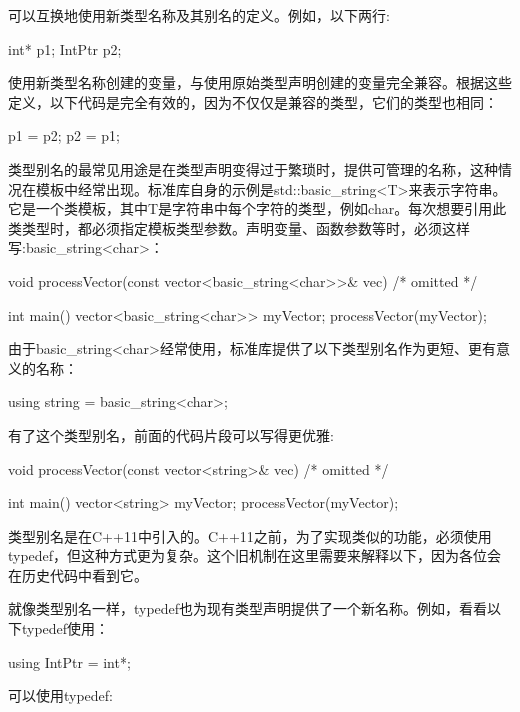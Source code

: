 可以互换地使用新类型名称及其别名的定义。例如，以下两行:

\begin{cpp}
int* p1;
IntPtr p2;
\end{cpp}

使用新类型名称创建的变量，与使用原始类型声明创建的变量完全兼容。根据这些定义，以下代码是完全有效的，因为不仅仅是兼容的类型，它们的类型也相同：

\begin{cpp}
p1 = p2;
p2 = p1;
\end{cpp}

类型别名的最常见用途是在类型声明变得过于繁琐时，提供可管理的名称，这种情况在模板中经常出现。标准库自身的示例是std::basic\_string<T>来表示字符串。它是一个类模板，其中T是字符串中每个字符的类型，例如char。每次想要引用此类类型时，都必须指定模板类型参数。声明变量、函数参数等时，必须这样写:basic\_string<char>：

\begin{cpp}
void processVector(const vector<basic_string<char>>& vec) { /* omitted */ }

int main()
{
    vector<basic_string<char>> myVector;
    processVector(myVector);
}
\end{cpp}

由于basic\_string<char>经常使用，标准库提供了以下类型别名作为更短、更有意义的名称：

\begin{cpp}
using string = basic_string<char>;
\end{cpp}

有了这个类型别名，前面的代码片段可以写得更优雅:

\begin{cpp}
void processVector(const vector<string>& vec) { /* omitted */ }

int main()
{
    vector<string> myVector;
    processVector(myVector);
}
\end{cpp}


类型别名是在C++11中引入的。C++11之前，为了实现类似的功能，必须使用typedef，但这种方式更为复杂。这个旧机制在这里需要来解释以下，因为各位会在历史代码中看到它。

就像类型别名一样，typedef也为现有类型声明提供了一个新名称。例如，看看以下typedef使用：

\begin{cpp}
using IntPtr = int*;
\end{cpp}

可以使用typedef:

